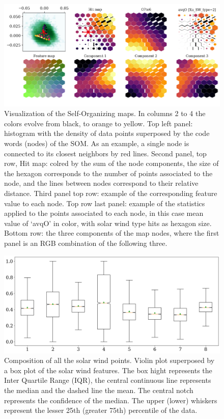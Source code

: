 \documentclass[utf8]{frontiersSCNS} %
\begin{document}
\begin{figure}[h!]
	\begin{center}
		\includegraphics[width=16cm]{maps}%
	\end{center}
	\caption{Visualization of the Self-Organizing maps. In columns 2 to 4 the colors evolve from black, to orange to yellow. Top left panel: histogram with the density of data points superposed by the code words (nodes) of the SOM. As an example, a single node is connected to its closest neighbors by red lines. Second panel, top row, Hit map: colred by the sum of the node components, the size of the hexagon corresponds to the number of points associated to the node, and the lines between nodes correspond to their relative distance. Third panel top row: example of the corresponding feature value to each node. Top row last panel: example of the statistics applied to the points associated to each node, in this case mean value of `avqO' in color, with solar wind type hits as hexagon size. Bottom row: the three components of the map nodes, where the first panel is an RGB combination of the following three.}\label{fig:maps}
\end{figure}

\begin{figure}[h!]
	\begin{center}
		\includegraphics[width=13cm]{Roberts/datarange}%
	\end{center}
	\caption{Composition of all the solar wind points. Violin plot superposed by a box plot of the solar wind features. The box hight represents the Inter Quartile Range (IQR), the central continuous line represents the median and the dashed line the mean. The central notch represents the confidence of the median. The upper (lower) whiskers represent the lesser 25th (greater 75th) percentile of the data. }\label{fig:datarange}
\end{figure}
\end{document}
